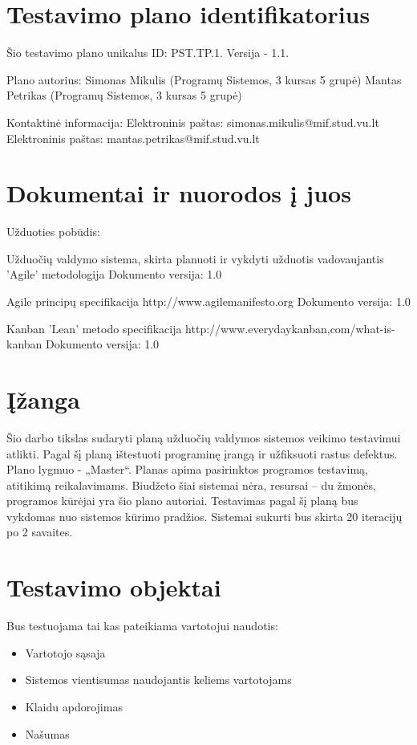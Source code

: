 
\section{Testavimo plano identifikatorius}

Šio testavimo plano unikalus ID: PST.TP.1.  Versija - 1.1.

Plano autorius: 
Simonas Mikulis (Programų Sistemos, 3 kursas 5 grupė)
Mantas Petrikas (Programų Sistemos, 3 kursas 5 grupė)

Kontaktinė informacija:
Elektroninis paštas: simonas.mikulis@mif.stud.vu.lt
Elektroninis paštas: mantas.petrikas@mif.stud.vu.lt


\section{Dokumentai ir nuorodos į juos}

Užduoties pobūdis:

Užduočių valdymo sistema, skirta planuoti ir vykdyti užduotis vadovaujantis 'Agile' metodologija
Dokumento versija: 1.0

Agile principų specifikacija
http://www.agilemanifesto.org
Dokumento versija: 1.0

Kanban 'Lean' metodo specifikacija
http://www.everydaykanban,com/what-is-kanban
Dokumento versija: 1.0


\section{Įžanga}

Šio darbo tikslas sudaryti planą užduočių valdymos sistemos veikimo testavimui atlikti.
Pagal šį planą ištestuoti programinę įrangą ir užfiksuoti rastus defektus.
Plano lygmuo - „Master“. Planas apima pasirinktos programos testavimą, atitikimą reikalavimams. 
Biudžeto šiai sistemai nėra, resursai – du žmonės, programos kūrėjai yra šio plano autoriai. 
Testavimas pagal šį planą bus vykdomas nuo sistemos kūrimo pradžios. Sistemai sukurti bus skirta 20 iteracijų po 2 savaites.


\section{Testavimo objektai}

Bus testuojama tai kas pateikiama vartotojui naudotis:

\begin{itemize}
	\item Vartotojo sąsaja
	\item Sistemos vientisumas naudojantis keliems vartotojams
	\item Klaidu apdorojimas
	\item Našumas
\end{itemize}


